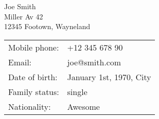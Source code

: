 Joe Smith \\
Miller Av 42\\
12345 Footown, Wayneland \\

{
\setlength\extrarowheight{0em}
\begin{tabular}{@{}ll}
  Mobile phone: & +12 345 678 90 \\
  Email: & joe@smith.com \\
  Date of birth: & January 1st, 1970, City \\
  Family status: & single \\
  Nationality: & Awesome \\
\end{tabular}
}
